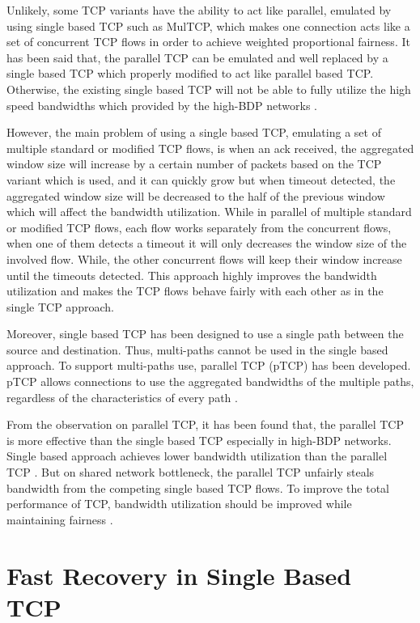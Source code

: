 \documentclass[a4paper, conference]{IEEEtran}
\begin{document}
Unlikely, some TCP variants have the ability to act like parallel, emulated by using single based TCP such as MulTCP, which makes one connection acts like a set of concurrent TCP flows in order to achieve weighted proportional fairness. It has been said that, the parallel TCP can be emulated and well replaced by a single based TCP which properly modified to act like parallel based TCP. Otherwise, the existing single based TCP will not be able to fully utilize the high speed bandwidths which provided by the high-BDP networks \cite{fu2007}.

However, the main problem of using a single based TCP, emulating a set of multiple standard or modified TCP flows, is when an ack received, the aggregated window size will increase by a certain number of packets based on the TCP variant which is used, and it can quickly grow but when timeout detected, the aggregated window size will be decreased to the half of the previous window which will affect the bandwidth utilization. While in parallel of multiple standard or modified TCP flows, each flow works separately from the concurrent flows, when one of them detects a timeout it will only decreases the window size of the involved flow. While, the other concurrent flows will keep their window increase until the timeouts detected. This approach highly improves the bandwidth utilization and makes the TCP flows behave fairly with each other as in the single TCP approach.

Moreover, single based TCP has been designed to use a single path between the source and destination. Thus, multi-paths cannot be used in the single based approach. To support multi-paths use, parallel TCP (pTCP) has been developed. pTCP allows connections to use the aggregated bandwidths of the multiple paths, regardless of the characteristics of every path \cite{hsieh2002}.

From the observation on parallel TCP, it has been found that, the parallel TCP is more effective than the single based TCP especially in high-BDP networks. Single based approach achieves lower bandwidth utilization than the parallel TCP \cite{fu2007}. But on shared network bottleneck, the parallel TCP unfairly steals bandwidth from the competing single based TCP flows. To improve the total performance of TCP, bandwidth utilization should be improved while maintaining fairness \cite{hacker2004b}.

\section{Fast Recovery in Single Based TCP}
\end{document}
